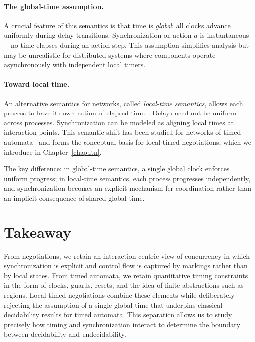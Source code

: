 \paragraph{The global-time assumption.} A crucial feature of this semantics is that time is \emph{global}: all clocks advance uniformly during delay transitions. Synchronization on action $a$ is instantaneous—no time elapses during an action step. This assumption simplifies analysis but may be unrealistic for distributed systems where components operate asynchronously with independent local timers.

\paragraph{Toward local time.} An alternative semantics for networks, called \emph{local-time semantics}, allows each process to have its own notion of elapsed time~\cite{}. Delays need not be uniform across processes. Synchronization can be modeled as aligning local times at interaction points. This semantic shift has been studied for networks of timed automata~\cite{LocalTimeTA} and forms the conceptual basis for local-timed negotiations, which we introduce in Chapter~\ref{chap:ltn}.

The key difference: in global-time semantics, a single global clock enforces uniform progress; in local-time semantics, each process progresses independently, and synchronization becomes an explicit mechanism for coordination rather than an implicit consequence of shared global time.

\section{Takeaway}
From negotiations, we retain an interaction-centric view of concurrency in which
synchronization is explicit and control flow is captured by markings rather than by
local states. From timed automata, we retain quantitative timing constraints in the
form of clocks, guards, resets, and the idea of finite abstractions such as regions.
Local-timed negotiations combine these elements while deliberately rejecting the
assumption of a single global time that underpins classical decidability results for
timed automata. This separation allows us to study precisely how timing and
synchronization interact to determine the boundary between decidability and
undecidability.


